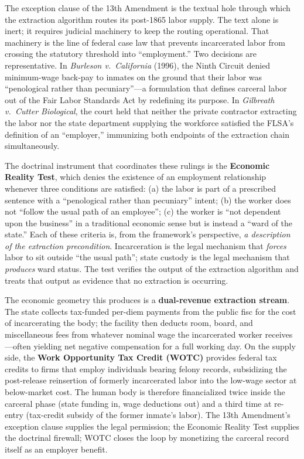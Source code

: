 The exception clause of the 13th Amendment is the textual hole through which the extraction algorithm routes its post-1865 labor supply. The text alone is inert; it requires judicial machinery to keep the routing operational. That machinery is the line of federal case law that prevents incarcerated labor from crossing the statutory threshold into ``employment.'' Two decisions are representative. In \textit{Burleson v.\ California} (1996), the Ninth Circuit denied minimum-wage back-pay to inmates on the ground that their labor was ``penological rather than pecuniary''---a formulation that defines carceral labor out of the Fair Labor Standards Act by redefining its purpose. In \textit{Gilbreath v.\ Cutter Biological}, the court held that neither the private contractor extracting the labor nor the state department supplying the workforce satisfied the FLSA's definition of an ``employer,'' immunizing both endpoints of the extraction chain simultaneously.

The doctrinal instrument that coordinates these rulings is the \textbf{Economic Reality Test}, which denies the existence of an employment relationship whenever three conditions are satisfied: (a) the labor is part of a prescribed sentence with a ``penological rather than pecuniary'' intent; (b) the worker does not ``follow the usual path of an employee''; (c) the worker is ``not dependent upon the business'' in a traditional economic sense but is instead a ``ward of the state.'' Each of these criteria is, from the framework's perspective, \textit{a description of the extraction precondition}. Incarceration is the legal mechanism that \textit{forces} labor to sit outside ``the usual path''; state custody is the legal mechanism that \textit{produces} ward status. The test verifies the output of the extraction algorithm and treats that output as evidence that no extraction is occurring.

The economic geometry this produces is a \textbf{dual-revenue extraction stream}. The state collects tax-funded per-diem payments from the public fisc for the cost of incarcerating the body; the facility then deducts room, board, and miscellaneous fees from whatever nominal wage the incarcerated worker receives---often yielding net negative compensation for a full working day. On the supply side, the \textbf{Work Opportunity Tax Credit (WOTC)} provides federal tax credits to firms that employ individuals bearing felony records, subsidizing the post-release reinsertion of formerly incarcerated labor into the low-wage sector at below-market cost. The human body is therefore financialized twice inside the carceral phase (state funding in, wage deductions out) and a third time at re-entry (tax-credit subsidy of the former inmate's labor). The 13th Amendment's exception clause supplies the legal permission; the Economic Reality Test supplies the doctrinal firewall; WOTC closes the loop by monetizing the carceral record itself as an employer benefit.

